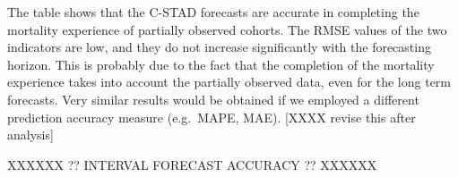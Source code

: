 \documentclass[11pt, a4paper]{article}
\begin{document}
%		
%		
%		

The table shows that the C-STAD forecasts are accurate in completing the mortality experience of partially observed cohorts. The RMSE values of the two indicators are low, and they do not increase significantly with the forecasting horizon. This is probably due to the fact that the completion of the mortality experience takes into account the partially observed data, even for the long term forecasts. Very similar results would be obtained if we employed a different prediction accuracy measure (e.g.~MAPE, MAE). [XXXX revise this after analysis] \par

\begin{center}
	XXXXXX ?? INTERVAL FORECAST ACCURACY ?? XXXXXX

\end{center}
\end{document}
